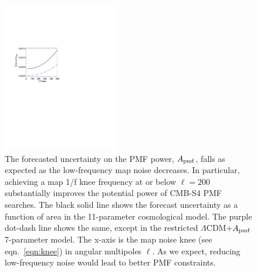 \documentclass[apj]{emulateapj}
\newcommand{\apmf}{\ensuremath{A_{\rm pmf}}}
\newcommand{\lcdm}{\ensuremath{\Lambda}CDM}
\begin{document}
\begin{figure}[htb]\centering
\includegraphics[width=0.45\textwidth,clip,trim={1.5cm 12.5cm 11cm 7.5cm}]{pmf_knee.pdf}
  \caption[Map knee dependence]{
  The forecasted uncertainty on the PMF power, \apmf{}, falls as expected as the low-frequency map noise decreases.  
  In particular, achieving a map 1/f knee frequency at or below $\ell = 200$ substantially improves the potential power of CMB-S4 PMF searches. 
  The black solid line shows the forecast uncertainty as a function of area in the 11-parameter cosmological model.
  The purple dot-dash line shows the same, except in the restricted \lcdm{}+\apmf{} 7-parameter model. 
  The x-axis is the map noise knee (see eqn.~\ref{eqn:knee}) in angular multipoles $\ell$. 
  As we expect, reducing low-frequency noise would lead to better PMF constraints. 
    \label{fig:knee}
  }
\end{figure}
\end{document}
